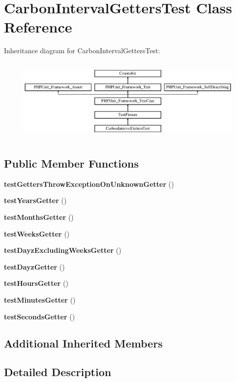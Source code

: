 \section{Carbon\+Interval\+Getters\+Test Class Reference}
\label{class_carbon_interval_getters_test}
Inheritance diagram for Carbon\+Interval\+Getters\+Test\+:\begin{figure}[H]
\begin{center}
\leavevmode
\includegraphics[height=4.129793cm]{class_carbon_interval_getters_test}
\end{center}
\end{figure}
\subsection*{Public Member Functions}
\begin{DoxyCompactItemize}
\item 
{\bf test\+Getters\+Throw\+Exception\+On\+Unknown\+Getter} ()
\item 
{\bf test\+Years\+Getter} ()
\item 
{\bf test\+Months\+Getter} ()
\item 
{\bf test\+Weeks\+Getter} ()
\item 
{\bf test\+Dayz\+Excluding\+Weeks\+Getter} ()
\item 
{\bf test\+Dayz\+Getter} ()
\item 
{\bf test\+Hours\+Getter} ()
\item 
{\bf test\+Minutes\+Getter} ()
\item 
{\bf test\+Seconds\+Getter} ()
\end{DoxyCompactItemize}
\subsection*{Additional Inherited Members}


\subsection{Detailed Description}


